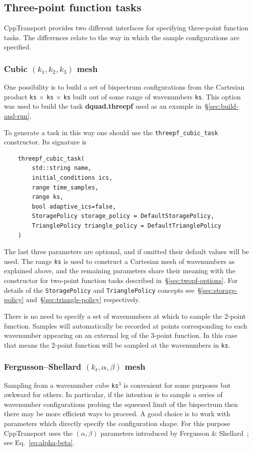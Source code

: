 \documentclass[11pt,a4paper]{article}
\newcommand{\repoobject}[1]{{\ttfamily\bfseries\small #1}}
\newcommand{\packagefont}{\sffamily}
\newcommand{\CppTransport}{{\packagefont CppTransport}}
\begin{document}
\subsection{Three-point function tasks}
\label{sec:threepf-options}
{\CppTransport} provides two different interfaces for
specifying three-point function tasks.
The differences relate to the way in which the sample configurations are specified.

\subsubsection{Cubic $(k_1, k_2, k_3)$ mesh}
One possibility is to build a set of bispectrum configurations from
the Cartesian product
\texttt{ks} $\times$
\texttt{ks} $\times$
\texttt{ks}
built out of some range of wavenumbers
\texttt{ks}.
This option was used to build the task
\repoobject{dquad.threepf} used as an example in~\S\ref{sec:build-and-run}.

To generate a task in this way one should use the
\texttt{threepf_cubic_task} constructor. Its signature is
\begin{verbatim}
    threepf_cubic_task(
        std::string name,
        initial_conditions ics,
        range time_samples,
        range ks,
        bool adaptive_ics=false,
        StoragePolicy storage_policy = DefaultStoragePolicy,
        TrianglePolicy triangle_policy = DefaultTrianglePolicy
    )
\end{verbatim}
The last three parameters are optional, and if omitted their
default values will be used.
The range \texttt{ks} is used to construct a Cartesian mesh
of wavenumbers as explained above, and the remaining parameters
share their meaning with the constructor for two-point function tasks
described in~\S\ref{sec:twopf-options}.
For details of the
\texttt{StoragePolicy} and
\texttt{TrianglePolicy} concepts
see~\S\ref{sec:storage-policy} and~\S\ref{sec:triangle-policy} respectively.

There is no need to specify a set of wavenumbers at which to sample the 2-point function.
Samples will automatically be recorded at points corresponding to each wavenumber appearing
on an external leg of the 3-point function.
In this case that means the 2-point function will be sampled at the wavenumbers
in \texttt{ks}.

\subsubsection{Fergusson--Shellard $(k_t, \alpha, \beta)$ mesh}
Sampling from a wavenumber cube \texttt{ks}$^3$
is convenient for some purposes but awkward for others.
In particular, if the intention is to sample a series of wavenumber configurations
probing the squeezed limit of the bispectrum then there may be more efficient
ways to proceed.
A good choice is to work with parameters which directly specify the configuration
shape.
For this purpose {\CppTransport} uses the $(\alpha, \beta)$ parameters
introduced by Fergusson \& Shellard~\cite{Fergusson:2006pr}; see Eq.~\eqref{eq:alpha-beta}.
\end{document}
